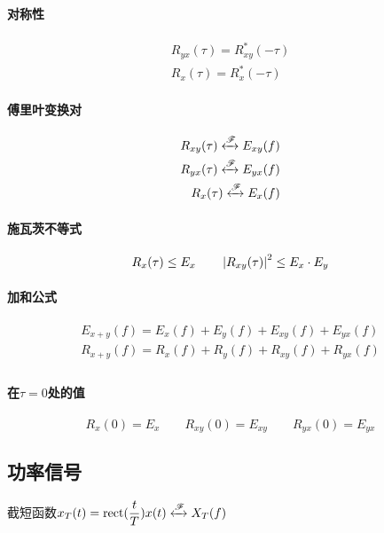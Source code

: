     \paragraph{对称性}
    \begin{align}
        R_{yx}(\tau)=R_{xy}^*(-\tau)\\
        R_x(\tau)=R_x^*(-\tau)
    \end{align}
    \paragraph{傅里叶变换对}
    \begin{align}
        R_{xy}(\tau)\xleftrightarrow[]{\mathscr{F}}E_{xy}(f)\\
        R_{yx}(\tau)\xleftrightarrow[]{\mathscr{F}}E_{yx}(f)\\
        R_x(\tau)\xleftrightarrow[]{\mathscr{F}}E_x(f)
    \end{align}
    \paragraph{施瓦茨不等式}
    \begin{equation}
        R_x(\tau)\leq E_x\hspace{2em}\left\vert R_{xy}(\tau) \right\vert^2\leq E_x\cdot E_y
    \end{equation}
    \paragraph{加和公式}
    \begin{align}
        E_{x+y}(f)=E_x(f)+E_y(f)+E_{xy}(f)+E_{yx}(f)\\
        R_{x+y}(f)=R_x(f)+R_y(f)+R_{xy}(f)+R_{yx}(f)\\
    \end{align}
    \paragraph{在$\tau=0$处的值}
    \begin{equation}
        R_x(0)=E_x\hspace{2em}R_{xy}(0)=E_{xy}\hspace{2em}R_{yx}(0)=E_{yx}
    \end{equation}

    \vspace{3ex}
    
\subsection{功率信号}
    截短函数$x_T(t)=\text{rect}(\dfrac{t}{T})x(t)\xleftrightarrow[]{\mathscr{F}}X_T(f)$
